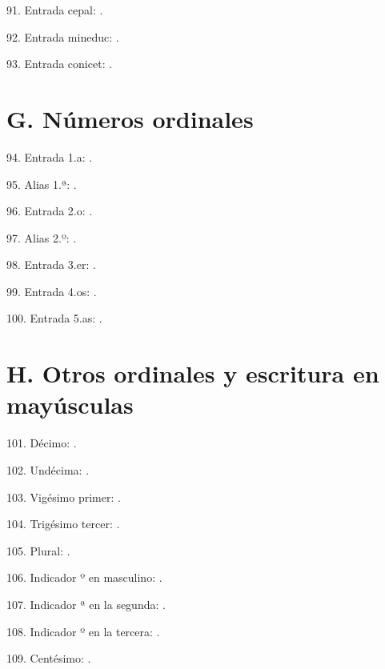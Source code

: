 \documentclass{article}
\begin{document}
91. Entrada cepal: .

92. Entrada mineduc: .

93. Entrada conicet: .

\section*{G. Números ordinales}

94. Entrada 1.a: .

95. Alias 1.ª: .

96. Entrada 2.o: .

97. Alias 2.º: .

98. Entrada 3.er: .

99. Entrada 4.os: .

100. Entrada 5.as: .

\section*{H. Otros ordinales y escritura en mayúsculas}

101. Décimo: .

102. Undécima: .

103. Vigésimo primer: .

104. Trigésimo tercer: .

105. Plural: .

106. Indicador º en masculino: .

107. Indicador ª en la segunda: .

108. Indicador º en la tercera: .

109. Centésimo: .
\end{document}
